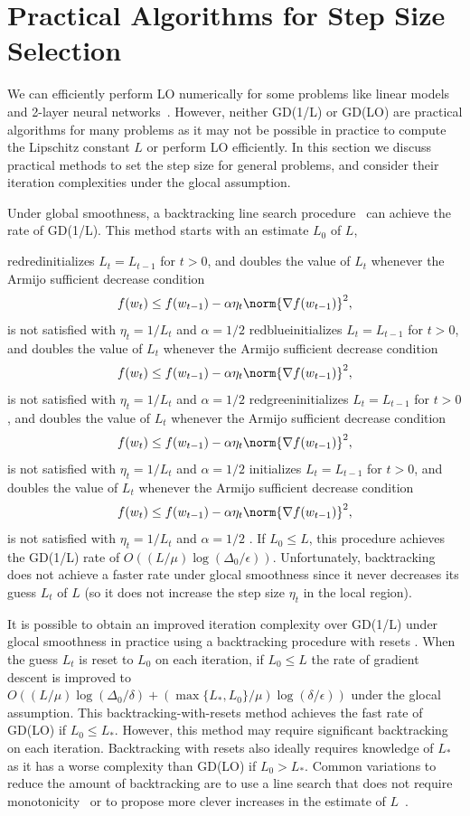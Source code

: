 \documentclass[10pt]{article} %
\newif\ifshowcolours
\def\red{red}
\def\blue{blue}
\def\green{green}
\renewcommand{\textcolor}[2]{%
  \ifshowcolours
    {\color{#1}#2}%
  \else
    \def\temp{#1}%
    \ifx\temp\red     #2\else
    \ifx\temp\blue    #2\else
    \ifx\temp\green   #2\else
        {\color{#1}#2}%
    \fi\fi\fi
  \fi
}
\begin{document}
\section{Practical Algorithms for Step Size Selection}\label{Practical}
We can efficiently perform LO numerically for some problems like linear models and 2-layer neural networks~\cite{shea2024line}. However, neither GD(1/L) or GD(LO) are practical algorithms for many problems as it may not be possible in practice to compute the Lipschitz constant $L$ or perform LO efficiently. In this section we discuss practical methods to set the step size for general problems, and consider their iteration complexities under the glocal assumption. 

Under global smoothness, a backtracking line search procedure~\cite{beck2009fast} can achieve the rate of GD(1/L). This method starts with an estimate $L_0$ of $L$, \textcolor{red}{initializes $L_t = L_{t-1}$ for $t>0$, and doubles the value of $L_t$ whenever the Armijo  sufficient decrease condition~\citep{armijo1966minimization}
\begin{equation}
    \label{armijo-backtracking}
    f(w_{t}) \leq f(w_{t-1}) - \alpha \eta_{t} \norm{\nabla f(w_{t-1})}^2,
\end{equation}
is not satisfied with $\eta_t=1/L_t$ and $\alpha=1/2$}. If $L_0 \leq L$, this procedure achieves the GD(1/L) rate of $O((L/\mu)\log(\Delta_{0}/\epsilon))$. Unfortunately, backtracking does not achieve a faster rate under glocal smoothness since it never decreases its guess $L_t$ of $L$ (so it does not increase the step size $\eta_t$ in the local region). 

It is possible to obtain an improved iteration complexity over GD(1/L) under glocal smoothness in practice using a backtracking procedure with resets \cite{Scheinberg2014}. When the guess $L_t$ is reset to $L_0$ on each iteration, if $L_0 \leq L$ the rate of gradient descent is improved to $O((L/\mu)\log(\Delta_{0}/\delta) + (\max\{L_*, L_0\}/\mu)\log(\delta/\epsilon))$ under the glocal assumption. This backtracking-with-resets method achieves the fast rate of GD(LO) if $L_0 \leq L_*$. However, this method may require significant backtracking on each iteration. Backtracking with resets also ideally requires knowledge of $L_*$ as it has a worse complexity than GD(LO) if $L_0 > L_*$. Common variations to reduce the amount of backtracking are to use a line search that does not require monotonicity~\cite{grippo1986nonmonotone,raydan1997barzilai} or to propose more clever increases in the estimate of $L$~\cite{cavalcanti2024adaptive}.
\end{document}
